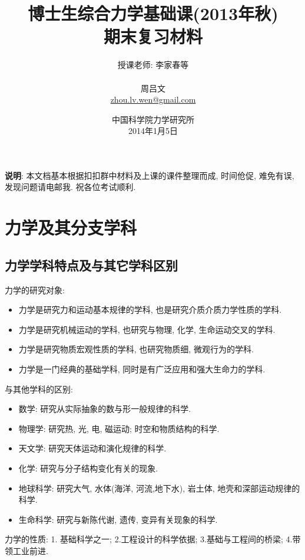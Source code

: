 \documentclass[a4paper,titlepage,twocolumn]{article}
\begin{document}
\title{博士生综合力学基础课(2013年秋)\\期末复习材料  \vspace{-20pt}}
\author{{\Large 授课老师: 李家春等}\\ \vspace{50pt}\\ 周吕文\\ \href{mailto:zhou.lv.wen@gmail.com}{zhou.lv.wen@gmail.com}\\ \vspace{50pt}}
\date{中国科学院力学研究所\\2014年1月5日}
\maketitle


\setcounter{page}{0}
\textbf{说明}: 本文档基本根据扣扣群中材料及上课的课件整理而成, 时间伧促, 难免有误, 发现问题请电邮我. 祝各位考试顺利.
\tableofcontents


\newpage
\section{力学及其分支学科}

\subsection{力学学科特点及与其它学科区别}
力学的研究对象:
\begin{itemize}
\item 力学是研究力和运动基本规律的学科, 也是研究介质介质力学性质的学科.
\item 力学是研究机械运动的学科, 也研究与物理, 化学, 生命运动交叉的学科.
\item 力学是研究物质宏观性质的学科, 也研究物质细, 微观行为的学科.
\item 力学是一门经典的基础学科, 同时是有广泛应用和强大生命力的学科.
\end{itemize}
与其他学科的区别:
\begin{itemize}
\item 数学: 研究从实际抽象的数与形一般规律的科学.
\item 物理学: 研究热, 光, 电, 磁运动; 时空和物质结构的科学.
\item 天文学: 研究天体运动和演化规律的科学.
\item 化学: 研究与分子结构变化有关的现象.
\item 地球科学: 研究大气, 水体(海洋, 河流,地下水), 岩土体, 地壳和深部运动规律的科学.
\item 生命科学: 研究与新陈代谢, 遗传, 变异有关现象的科学.
\end{itemize}
力学的性质: 1. 基础科学之一; 2.工程设计的科学依据; 3.基础与工程间的桥梁; 4.带领工业前进.
\end{document}
